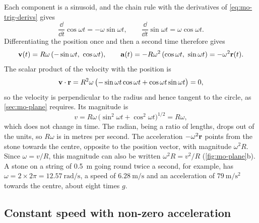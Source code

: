 Each component is a sinusoid, and the chain rule with the derivatives of
\cref{eq:mo-trig-derivs} gives
\begin{equation*}
   \frac{\dd}{\dd t}\cos\omega t = -\omega\sin\omega t, \qquad
   \frac{\dd}{\dd t}\sin\omega t = \omega\cos\omega t .
\end{equation*}
Differentiating the position once and then a second time therefore gives
\begin{equation}
   \vb{v}(t) = R\omega\,(-\sin\omega t,\ \cos\omega t), \qquad
   \vb{a}(t) = -R\omega^2\,(\cos\omega t,\ \sin\omega t) = -\omega^2\vb{r}(t).
   \label{eq:mo-circle}
\end{equation}
The scalar product of the velocity with the position is
\begin{equation*}
   \bm{\mathrm{v}}\cdot\bm{\mathrm{r}} = R^2\omega\,\bigl(-\sin\omega t\cos\omega t
   + \cos\omega t\sin\omega t\bigr) = 0 ,
\end{equation*}
so the velocity is perpendicular to the radius and hence tangent to the
circle, as \cref{sec:mo-plane} requires. Its magnitude is
\begin{equation*}
   v = R\omega\,\bigl(\sin^2\omega t + \cos^2\omega t\bigr)^{1/2} = R\omega ,
\end{equation*}
which does not change in time. The radian, being a ratio of lengths,
drops out of the units, so $R\omega$ is in metres per second. The
acceleration $-\omega^2\bm{\mathrm{r}}$ points
from the stone towards the centre, opposite to the position vector, with
magnitude $\omega^2 R$. Since $\omega = v/R$, this magnitude can also be
written $\omega^2 R = v^2/R$ (\cref{fig:mo-plane}b). A stone on a string
of \SI{0.5}{\metre} going round twice a second, for example, has $\omega
= 2\times2\pi = \SI{12.57}{\radian\per\second}$, a speed of
$\SI{6.28}{\metre\per\second}$ and an acceleration of
$\SI{79}{\metre\per\second\squared}$ towards the centre, about eight
times $g$.

\subsection*{Constant speed with non-zero acceleration}

